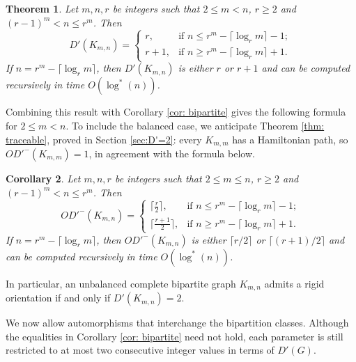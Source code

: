 \documentclass[a4paper,12pt]{elsarticle}
\newtheorem{theorem}{Theorem}
\newtheorem{corollary}[theorem]{Corollary}
\begin{document}
\begin{theorem} \cite{FisherIsaak,ijk}
Let $m,n,r$ be integers such that $2\leq m<n$, $r\geq 2$ and $(r-1)^m<n\leq r^m$. Then
$$D'(K_{m,n}) = \left\{ 
\begin{array}{ll}
r, & \textrm{if } n \leq r^m - \lceil \log_r m \rceil -1;\\
r+1, & \textrm{if } n \geq  r^m - \lceil \log_r m \rceil +1.
\end{array} 
\right.$$
If $n=r^m - \lceil \log_r m \rceil$, then $D'(K_{m,n})$ is either $r$ or $r+1$ and can be computed recursively in time $O(\log^*(n))$.
\end{theorem}

Combining this result with Corollary \ref{cor: bipartite} gives the following formula for $2\leq m<n$. To include the balanced case, we anticipate Theorem \ref{thm: traceable}, proved in Section \ref{sec:D'=2}: every $K_{m,m}$ has a Hamiltonian path, so $OD'^-(K_{m,m})=1$, in agreement with the formula below.

\begin{corollary}
Let $m,n,r$ be integers such that $2\leq m\leq n$, $r\geq 2$ and $(r-1)^m<n\leq r^m$. Then
$$OD'^-(K_{m,n}) = \left\{ 
\begin{array}{ll}
\lceil \frac{r}2 \rceil, & \textrm{if } n \leq r^m - \lceil \log_r m \rceil -1;\\
\lceil \frac{r+1}2 \rceil, & \textrm{if } n \geq  r^m - \lceil \log_r m \rceil +1.
\end{array} 
\right.$$
If $n=r^m - \lceil \log_r m \rceil$, then $OD'^-(K_{m,n})$ is either $\lceil r/2 \rceil$ or $\lceil (r+1)/2 \rceil$ and can be computed recursively in time $O(\log^*(n))$.
\end{corollary}

In particular, an unbalanced complete bipartite graph $K_{m,n}$ admits a rigid orientation if and only if $D'(K_{m,n}) = 2$. 

We now allow automorphisms that interchange the bipartition classes. Although the equalities in Corollary \ref{cor: bipartite} need not hold, each parameter is still restricted to at most two consecutive integer values in terms of $D'(G)$.
\end{document}
